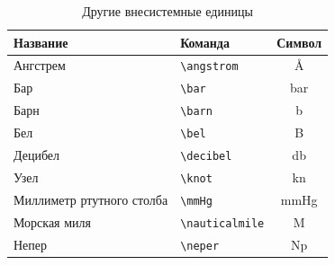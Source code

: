 \begin{table}
    \centering
    \begin{threeparttable}%
        \caption{Другие внесистемные единицы}\label{tab:unit:other}
        \begin{tabular}{llc}
            \toprule
            Название                  & Команда              & Символ             \\
            \midrule
            Ангстрем                  & \verb|\angstrom|     & \si{\angstrom}     \\
            Бар                       & \verb|\bar|          & \si{\bar}          \\
            Барн                      & \verb|\barn|         & \si{\barn}         \\
            Бел                       & \verb|\bel|          & \si{\bel}          \\
            Децибел                   & \verb|\decibel|      & \si{\decibel}      \\
            Узел                      & \verb|\knot|         & \si{\knot}         \\
            Миллиметр ртутного столба & \verb|\mmHg|         & \si{\mmHg}         \\
            Морская миля              & \verb|\nauticalmile| & \si{\nauticalmile} \\
            Непер                     & \verb|\neper|        & \si{\neper}        \\
            \bottomrule
        \end{tabular}
    \end{threeparttable}
\end{table}

